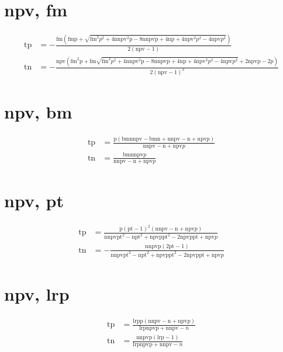 \documentclass[3p,times]{elsarticle}
\begin{document}
\begin{footnotesize}
\begin{landscape}
\section{npv, fm}
\begin{align}
\mathrm{tp} &= - \frac{\mathrm{fm} \left(\mathrm{fm} \mathrm{p} + \sqrt{\mathrm{fm}^{2} p^{2} + 4 \mathrm{n} \mathrm{npv}^{2} \mathrm{p} - 8 \mathrm{n} \mathrm{npv} \mathrm{p} + 4 \mathrm{n} \mathrm{p} + 4 \mathrm{npv}^{2} p^{2} - 4 \mathrm{npv} p^{2}}\right)}{2 \left(\mathrm{npv} - 1\right)}\\
\mathrm{tn} &= - \frac{\mathrm{npv} \left(\mathrm{fm}^{2} \mathrm{p} + \mathrm{fm} \sqrt{\mathrm{fm}^{2} p^{2} + 4 \mathrm{n} \mathrm{npv}^{2} \mathrm{p} - 8 \mathrm{n} \mathrm{npv} \mathrm{p} + 4 \mathrm{n} \mathrm{p} + 4 \mathrm{npv}^{2} p^{2} - 4 \mathrm{npv} p^{2}} + 2 \mathrm{npv} \mathrm{p} - 2 p\right)}{2 \left(\mathrm{npv} - 1\right)^{2}}
\end{align}
\section{npv, bm}
\begin{align}
\mathrm{tp} &= \frac{\mathrm{p} \left(\mathrm{bm} \mathrm{n} \mathrm{npv} - \mathrm{bm} \mathrm{n} + \mathrm{n} \mathrm{npv} - \mathrm{n} + \mathrm{npv} p\right)}{\mathrm{n} \mathrm{npv} - \mathrm{n} + \mathrm{npv} p}\\
\mathrm{tn} &= \frac{\mathrm{bm} \mathrm{n} \mathrm{npv} p}{\mathrm{n} \mathrm{npv} - \mathrm{n} + \mathrm{npv} p}
\end{align}
\section{npv, pt}
\begin{align}
\mathrm{tp} &= \frac{\mathrm{p} \left(\mathrm{pt} - 1\right)^{2} \left(\mathrm{n} \mathrm{npv} - \mathrm{n} + \mathrm{npv} p\right)}{\mathrm{n} \mathrm{npv} \mathrm{pt}^{2} - \mathrm{n} \mathrm{pt}^{2} + \mathrm{npv} \mathrm{p} \mathrm{pt}^{2} - 2 \mathrm{npv} \mathrm{p} \mathrm{pt} + \mathrm{npv} p}\\
\mathrm{tn} &= - \frac{\mathrm{n} \mathrm{npv} \mathrm{p} \left(2 \mathrm{pt} - 1\right)}{\mathrm{n} \mathrm{npv} \mathrm{pt}^{2} - \mathrm{n} \mathrm{pt}^{2} + \mathrm{npv} \mathrm{p} \mathrm{pt}^{2} - 2 \mathrm{npv} \mathrm{p} \mathrm{pt} + \mathrm{npv} p}
\end{align}
\section{npv, lrp}
\begin{align}
\mathrm{tp} &= \frac{\mathrm{lrp} \mathrm{p} \left(\mathrm{n} \mathrm{npv} - \mathrm{n} + \mathrm{npv} p\right)}{\mathrm{lrp} \mathrm{npv} \mathrm{p} + \mathrm{n} \mathrm{npv} - n}\\
\mathrm{tn} &= \frac{\mathrm{n} \mathrm{npv} \mathrm{p} \left(\mathrm{lrp} - 1\right)}{\mathrm{lrp} \mathrm{npv} \mathrm{p} + \mathrm{n} \mathrm{npv} - n}
\end{align}

\end{landscape}
\end{footnotesize}
\end{document}
